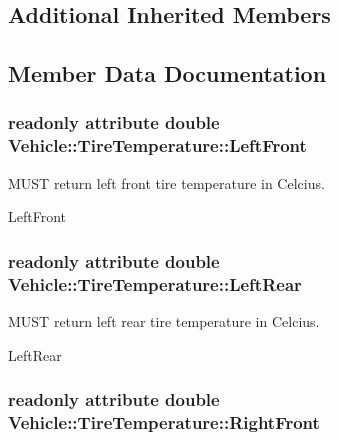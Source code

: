\subsection*{Additional Inherited Members}


\subsection{Member Data Documentation}
\hypertarget{interfaceVehicle_1_1TireTemperature_a4c0e69fc83f633be2c10adac5d476ec1}{
\subsubsection[{Left\-Front}]{\setlength{\rightskip}{0pt plus 5cm}readonly attribute double Vehicle\-::\-Tire\-Temperature\-::\-Left\-Front}}\label{interfaceVehicle_1_1TireTemperature_a4c0e69fc83f633be2c10adac5d476ec1}


M\-U\-S\-T return left front tire temperature in Celcius. 

Left\-Front \hypertarget{interfaceVehicle_1_1TireTemperature_a7ff76f8b41420cc7f079b390d12a7bc5}{
\subsubsection[{Left\-Rear}]{\setlength{\rightskip}{0pt plus 5cm}readonly attribute double Vehicle\-::\-Tire\-Temperature\-::\-Left\-Rear}}\label{interfaceVehicle_1_1TireTemperature_a7ff76f8b41420cc7f079b390d12a7bc5}


M\-U\-S\-T return left rear tire temperature in Celcius. 

Left\-Rear \hypertarget{interfaceVehicle_1_1TireTemperature_a31c1212ad03870867815c06204abcec0}{
\subsubsection[{Right\-Front}]{\setlength{\rightskip}{0pt plus 5cm}readonly attribute double Vehicle\-::\-Tire\-Temperature\-::\-Right\-Front}}\label{interfaceVehicle_1_1TireTemperature_a31c1212ad03870867815c06204abcec0}


